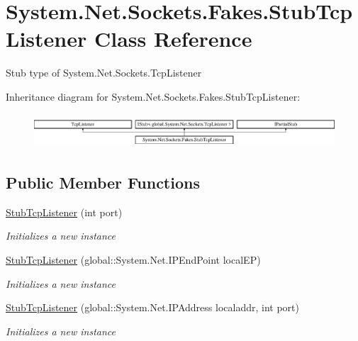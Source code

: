 \hypertarget{class_system_1_1_net_1_1_sockets_1_1_fakes_1_1_stub_tcp_listener}{\section{System.\-Net.\-Sockets.\-Fakes.\-Stub\-Tcp\-Listener Class Reference}
\label{class_system_1_1_net_1_1_sockets_1_1_fakes_1_1_stub_tcp_listener}
}


Stub type of System.\-Net.\-Sockets.\-Tcp\-Listener 


Inheritance diagram for System.\-Net.\-Sockets.\-Fakes.\-Stub\-Tcp\-Listener\-:\begin{figure}[H]
\begin{center}
\leavevmode
\includegraphics[height=1.282932cm]{class_system_1_1_net_1_1_sockets_1_1_fakes_1_1_stub_tcp_listener}
\end{center}
\end{figure}
\subsection*{Public Member Functions}
\begin{DoxyCompactItemize}
\item 
\hyperlink{class_system_1_1_net_1_1_sockets_1_1_fakes_1_1_stub_tcp_listener_a3ef08177a819d74154466ef944690878}{Stub\-Tcp\-Listener} (int port)
\begin{DoxyCompactList}\small\item\em Initializes a new instance\end{DoxyCompactList}\item 
\hyperlink{class_system_1_1_net_1_1_sockets_1_1_fakes_1_1_stub_tcp_listener_a9912a2659a5028db97263a79acace748}{Stub\-Tcp\-Listener} (global\-::\-System.\-Net.\-I\-P\-End\-Point local\-E\-P)
\begin{DoxyCompactList}\small\item\em Initializes a new instance\end{DoxyCompactList}\item 
\hyperlink{class_system_1_1_net_1_1_sockets_1_1_fakes_1_1_stub_tcp_listener_a4e6f85be2cb87d64d769829f5729b35c}{Stub\-Tcp\-Listener} (global\-::\-System.\-Net.\-I\-P\-Address localaddr, int port)
\begin{DoxyCompactList}\small\item\em Initializes a new instance\end{DoxyCompactList}\end{DoxyCompactItemize}
